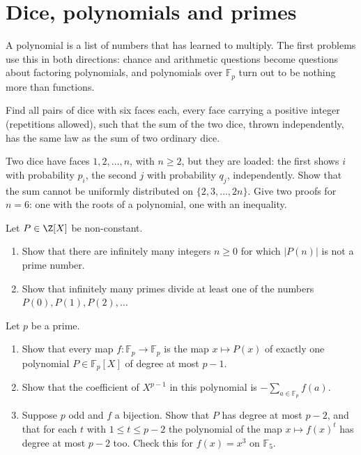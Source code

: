 \section{Dice, polynomials and primes}

A polynomial is a list of numbers that has learned to multiply. The first problems use this in both directions: chance and
arithmetic questions become questions about factoring polynomials, and polynomials over $\mathbb F_p$ turn out to be nothing
more than functions.

\begin{exercise}[$\star\star$]\label{pb:sicherman}
Find all pairs of dice with six faces each, every face carrying a positive integer (repetitions allowed), such that the sum
of the two dice, thrown independently, has the same law as the sum of two ordinary dice.
\end{exercise}

\begin{exercise}[$\star\star$]\label{pb:loaded}
Two dice have faces $1,2,\dots,n$, with $n\ge2$, but they are loaded: the first shows $i$ with probability $p_i$, the
second $j$ with probability $q_j$, independently. Show that the sum cannot be uniformly distributed on $\{2,3,\dots,2n\}$.
Give two proofs for $n=6$: one with the roots of a polynomial, one with an inequality.
\end{exercise}

\begin{exercise}[$\star\star$]\label{pb:primepoly}
Let $P\in\Z[X]$ be non-constant.
\begin{enumerate}[label=(\alph*)]
\item Show that there are infinitely many integers $n\ge0$ for which $|P(n)|$ is not a prime number.
\item Show that infinitely many primes divide at least one of the numbers $P(0),P(1),P(2),\dots$
\end{enumerate}
\end{exercise}

\begin{exercise}[$\star\star$]\label{pb:fpfunctions}
Let $p$ be a prime.
\begin{enumerate}[label=(\alph*)]
\item Show that every map $f:\mathbb F_p\to\mathbb F_p$ is the map $x\mapsto P(x)$ of exactly one polynomial $P\in\mathbb F_p[X]$
of degree at most $p-1$.
\item Show that the coefficient of $X^{p-1}$ in this polynomial is $-\sum_{a\in\mathbb F_p}f(a)$.
\item Suppose $p$ odd and $f$ a bijection. Show that $P$ has degree at most $p-2$, and that for each $t$ with $1\le t\le p-2$
the polynomial of the map $x\mapsto f(x)^t$ has degree at most $p-2$ too. Check this for $f(x)=x^3$ on $\mathbb F_5$.
\end{enumerate}
\end{exercise}


